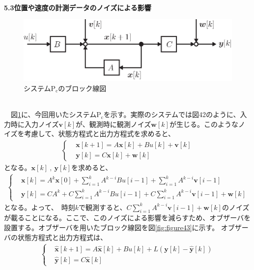 \documentclass[a4paper,10.5pt]{ltjsarticle}
\begin{document}
\\
{\large \bfseries 5.3位置や速度の計測データのノイズによる影響}\\
\begin{figure}[h]
  \centering
  \includegraphics[scale=1.2]{figure42.eps}
  \caption{システム$\mathrm{P_c}$のブロック線図}
  \label{fig:figure42}
\end{figure}\\
　図\ref{fig:figure42}に、今回用いたシステム$\mathrm{P_c}$を示す。実際のシステムでは図42のように、入力時に入力ノイズ$\bm v[k]$が、観測時に観測ノイズ$\bm w[k]$が生じる。このようなノイズを考慮して、状態方程式と出力方程式を求めると、
\begin{align}
  \left\{
  \begin{aligned}
    &\bm x[k+1]=A\bm x[k]+Bu[k]+\bm v[k]\\
    &\bm y[k]=C\bm x[k]+\bm w[k]
  \end{aligned}
  \right .
\end{align}
となる。$\bm x[k]\ ,\ \bm y[k]$を求めると、
\begin{align}
  \left\{
  \begin{aligned}
    &\bm x[k]=A^k\bm x[0]+\sum^{k}_{i=1}A^{k-i}Bu[i-1]+\sum^{k}_{i=1}A^{k-i}\bm v[i-1]\\
    &\bm y[k]=CA^k+C\sum^{k}_{i=1}A^{k-i}Bu[i-1]+C\sum^{k}_{i=1}A^{k-i}\bm v[i-1]+\bm w[k]
  \end{aligned}
  \right .
\end{align}
となる。よって、 時刻$k$で観測すると、$C\sum^{k}_{i=1}A^{k-i}\bm v[i-1]+\bm w[k]$のノイズが載ることになる。ここで、このノイズによる影響を減らすため、オブザーバを設置する。オブザーバを用いたブロック線図を図\ref{fig:figure43}に示す。
オブザーバの状態方程式と出力方程式は、
\begin{align}
  \left\{
  \begin{aligned}
    &\hat{\bm x}[k+1]=A\hat{\bm x}[k]+Bu[k]+L\left(\bm y[k]-\hat{\bm y}[k]\right)\\
    &\hat{\bm y}[k]=C\hat{\bm x}[k]
  \end{aligned}
  \right .
\end{align}
\end{document}
